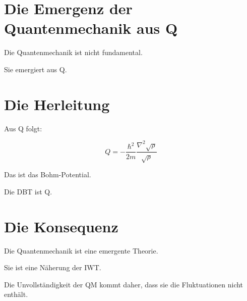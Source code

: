 
\section{Die Emergenz der Quantenmechanik aus Q}

Die Quantenmechanik ist nicht fundamental.

Sie emergiert aus Q.

\section{Die Herleitung}

Aus Q folgt:

\[
Q = -\frac{\hbar^2}{2m} \frac{\nabla^2 \sqrt{\rho}}{\sqrt{\rho}}
\]

Das ist das Bohm-Potential.

Die DBT ist Q.

\section{Die Konsequenz}

Die Quantenmechanik ist eine emergente Theorie.

Sie ist eine Näherung der IWT.

Die Unvollständigkeit der QM kommt daher, dass sie die Fluktuationen nicht enthält.